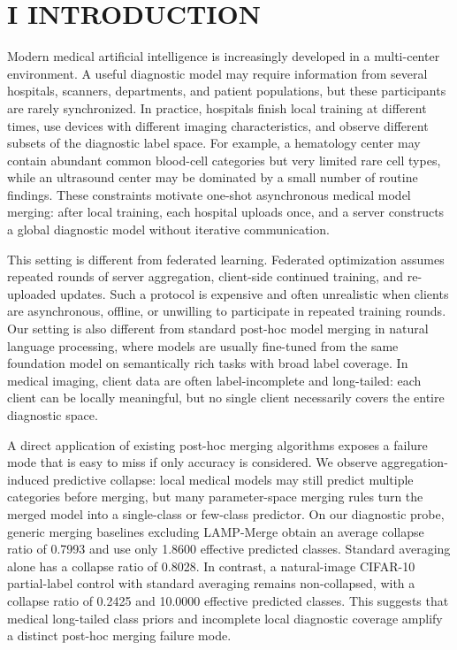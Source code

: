 
\section{I INTRODUCTION}

Modern medical artificial intelligence is increasingly developed in a multi-center environment. A useful diagnostic model may require information from several hospitals, scanners, departments, and patient populations, but these participants are rarely synchronized. In practice, hospitals finish local training at different times, use devices with different imaging characteristics, and observe different subsets of the diagnostic label space. For example, a hematology center may contain abundant common blood-cell categories but very limited rare cell types, while an ultrasound center may be dominated by a small number of routine findings. These constraints motivate one-shot asynchronous medical model merging: after local training, each hospital uploads once, and a server constructs a global diagnostic model without iterative communication.

This setting is different from federated learning. Federated optimization assumes repeated rounds of server aggregation, client-side continued training, and re-uploaded updates. Such a protocol is expensive and often unrealistic when clients are asynchronous, offline, or unwilling to participate in repeated training rounds. Our setting is also different from standard post-hoc model merging in natural language processing, where models are usually fine-tuned from the same foundation model on semantically rich tasks with broad label coverage. In medical imaging, client data are often label-incomplete and long-tailed: each client can be locally meaningful, but no single client necessarily covers the entire diagnostic space.

A direct application of existing post-hoc merging algorithms exposes a failure mode that is easy to miss if only accuracy is considered. We observe aggregation-induced predictive collapse: local medical models may still predict multiple categories before merging, but many parameter-space merging rules turn the merged model into a single-class or few-class predictor. On our diagnostic probe, generic merging baselines excluding LAMP-Merge obtain an average collapse ratio of 0.7993 and use only 1.8600 effective predicted classes. Standard averaging alone has a collapse ratio of 0.8028. In contrast, a natural-image CIFAR-10 partial-label control with standard averaging remains non-collapsed, with a collapse ratio of 0.2425 and 10.0000 effective predicted classes. This suggests that medical long-tailed class priors and incomplete local diagnostic coverage amplify a distinct post-hoc merging failure mode.

